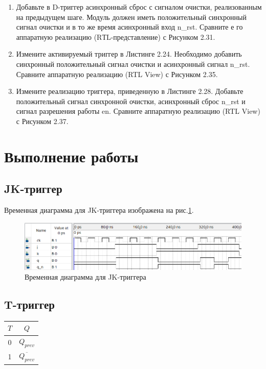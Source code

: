 \documentclass[a4paper,14pt]{article}
\begin{document}
\begin{enumerate}
	\item Добавьте в D-триггер асинхронный сброс с сигналом очистки, реализованным на предыдущем шаге.
	Модуль должен иметь положительный синхронный сигнал очистки и в то же время асинхронный вход n\_rst.
	Сравните е го аппаратную реализацию (RТL-представление) с Рисунком 2.31.
	
	\item Измените активируемый триггер в Листинге 2.24.
	Необходимо добавить синхронный положительный сигнал очистки и асинхронный сигнал n\_rst.
	Сравните аппаратную реализацию (RTL View) с Рисунком 2.35.
	
	\item Измените реализацию триггера, приведенную в Листинге 2.28. 
	Добавьте положительный сигнал синхронной очистки, асинхронный сброс n\_rst и сигнал разрешения работы en.
	Сравните аппаратную реализацию (RTL View) с Рисунком 2.37.
\end{enumerate}

\section{Выполнение работы}

\subsection{JK-триггер}


Временная диаграмма для JK-триггера изображена на рис.\ref{fig:jk_wave}.

\begin{figure}[H]
	\centering
	\includegraphics[width=0.95\linewidth]{imgs/jk_wave}
	\caption{Временная диаграмма для JK-триггера}
	\label{fig:jk_wave}
\end{figure}


\subsection{T-триггер}


\begin{table}[H]
	\begin{center}
		\begin{flushleft}
		\end{flushleft}
		\label{tab:t_flip_flop}
		\begin{tabular}{|c|c|}
			\hline
			$T$ & $Q$                   \\ \hline
			0   & $Q_{prev}$            \\ \hline
			1   & $\overline{Q_{prev}}$ \\ \hline
		\end{tabular}
	\end{center}
\end{table}
\end{document}
